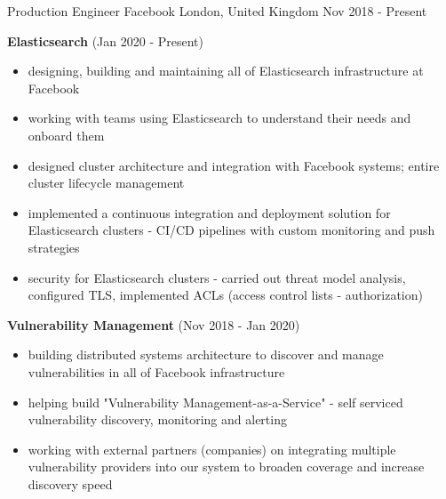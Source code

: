 
\begin{cventries}

  \cventry
    {Production Engineer} %
    {Facebook} %
    {London, United Kingdom} %
    {Nov 2018 - Present} %
    {
      \begin{cvitems} %
        \item {
          \textbf{Elasticsearch} (Jan 2020 - Present)
          \begin{itemize}
            \item {designing, building and maintaining all of Elasticsearch infrastructure at Facebook}
            \item {working with teams using Elasticsearch to understand their needs and onboard them}
            \item {designed cluster architecture and integration with Facebook systems; entire cluster lifecycle management}
            \item {implemented a continuous integration and deployment solution for Elasticsearch clusters - CI/CD pipelines with custom monitoring and push strategies}
            \item {security for Elasticsearch clusters - carried out threat model analysis, configured TLS, implemented ACLs (access control lists - authorization)}
          \end{itemize}
        }
        \item {
          \textbf{Vulnerability Management} (Nov 2018 - Jan 2020)
          \begin{itemize}
            \item {building distributed systems architecture to discover and manage vulnerabilities in all of Facebook infrastructure}
            \item {helping build "Vulnerability Management-as-a-Service" - self serviced vulnerability discovery, monitoring and alerting}
            \item {working with external partners (companies) on integrating multiple vulnerability providers into our system to broaden coverage and increase discovery speed}

\end{itemize}}
\end{cvitems}}
\end{cventries}
